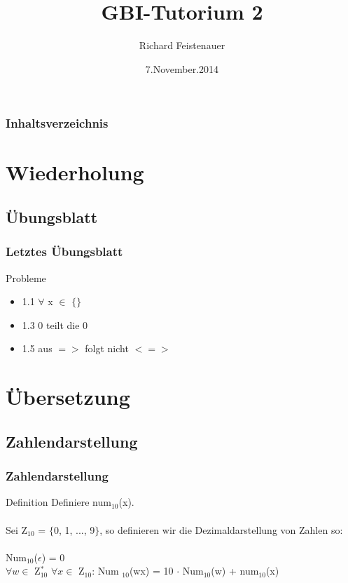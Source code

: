 \documentclass{beamer}
\author{Richard Feistenauer}
\title{GBI-Tutorium 2}
\date{7.November.2014}
\begin{document}
\begin{frame}
	\titlepage
\end{frame}

\begin{frame}
	\frametitle {Inhaltsverzeichnis}
	\tableofcontents
\end{frame}

\section{Wiederholung}
\subsection{Übungsblatt}
\begin{frame}
	\frametitle{Letztes \"Ubungsblatt}
	\begin{block}{Probleme}
		\begin{itemize}
			\item 1.1 $\forall$ x $\in$ $\{\}$
			\item 1.3 0 teilt die 0
			\item 1.5 aus $=>$ folgt nicht $<=>$
		\end{itemize}
	\end{block}
\end{frame}

\section{Übersetzung}
\subsection{Zahlendarstellung}
\begin{frame}
	\frametitle{Zahlendarstellung}
	\begin{block}{Definition}
		Definiere num$_{10}$(x).\\
		\pause
		\hfill\\
		Sei Z$_{10}$ = $\{$0, 1, ..., 9$\}$, so definieren wir die 				Dezimaldarstellung von Zahlen so:\\
		\hfill\\
		Num$_{10}$($\epsilon$) = 0\\
		$\forall w \in$ Z$_{10}^*$ $ \forall x \in$ Z$_{10}$: Num				$_{10}$(wx) = 10 $\cdot$ Num$_{10}$(w) + num$_{10}$(x)
	\end{block}
\end{frame}
\end{document}
